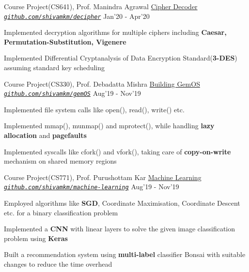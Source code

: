 \begin{cventries}
	
	\cventry
	{Course Project(CS641), Prof. Manindra Agrawal}
	{\href{https://github.com/shivamkm/decipher}{Cipher Decoder}}
	{\emph{\texttt{\href{https://github.com/shivamkm/decipher}{github.com/shivamkm/decipher}}}}
	{Jan'20 - Apr'20}
	{
		\begin{cvitems}
			\item Implemented decryption algorithms for multiple ciphers including \textbf{Caesar, Permutation-Substitution, Vigenere}
			\item Implemented Differential Cryptanalysis of Data Encryption Standard(\textbf{3-DES}) assuming standard key scheduling
		\end{cvitems}
	}
\cventry
{Course Project(CS330), Prof. Debadatta Mishra}
{\href{https://github.com/shivamkm/gemOS}{Building GemOS}}
{\emph{\texttt{\href{https://github.com/shivamkm/gemOS}{github.com/shivamkm/gemOS}}}}
{Aug'19 - Nov'19}
{
	\begin{cvitems}
		\item Implemented file system calls like open(), read(), write() etc.
		\item Implemented mmap(), munmap() and mprotect(), while handling \textbf{lazy allocation} and \textbf{pagefaults}
		\item Implemented syscalls like cfork() and vfork(), taking care of \textbf{copy-on-write} mechanism on shared memory regions
	\end{cvitems}
}
\cventry
{Course Project(CS771), Prof. Purushottam Kar}
{\href{https://github.com/shivamkm/machine-learning}{Machine Learning}}
{\emph{\texttt{\href{https://github.com/shivamkm/machine-learning}{github.com/shivamkm/machine-learning}}}}
{Aug'19 - Nov'19}
{
	\begin{cvitems}
		\item Employed algorithms like \textbf{SGD}, Coordinate Maximisation, Coordinate Descent etc. for a binary classification problem
		\item Implemented a \textbf{CNN} with linear layers to solve the given image classification problem using \textbf{Keras}
		\item Built a recommendation system using \textbf{multi-label} classifier Bonsai with suitable changes to reduce the time overhead

\end{cvitems}}
\end{cventries}
